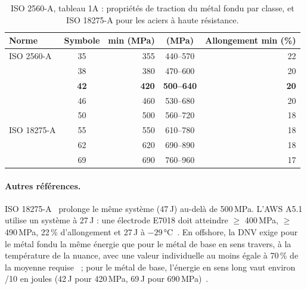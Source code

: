 \begin{table}[htbp]
\centering
\small
\caption{ISO 2560-A, tableau 1A : propriétés de traction du métal fondu par
classe, et ISO 18275-A pour les aciers à haute résistance.}
\label{tab:iso2560}
\begin{tabular}{@{}l c r c r@{}}
\toprule
Norme & Symbole & \YS{} min (MPa) & \UTS{} (MPa) & Allongement min (\%) \\
\midrule
ISO 2560-A & 35 & 355 & 440--570 & 22 \\
           & 38 & 380 & 470--600 & 20 \\
           & \textbf{42} & \textbf{420} & \textbf{500--640} & \textbf{20} \\
           & 46 & 460 & 530--680 & 20 \\
           & 50 & 500 & 560--720 & 18 \\
\midrule
ISO 18275-A & 55 & 550 & 610--780 & 18 \\
            & 62 & 620 & 690--890 & 18 \\
            & 69 & 690 & 760--960 & 17 \\
\bottomrule
\end{tabular}
\end{table}

\paragraph{Autres références.} ISO 18275-A~\cite{iso_18275} prolonge le même
système (47\,J) au-delà de 500\,MPa. L'AWS A5.1 utilise un système à 27\,J :
une électrode E7018 doit atteindre \YS{} $\geq$ 400\,MPa, \UTS{} $\geq$ 490\,MPa,
22\,\% d'allongement et 27\,J à $-29$\,°C~\cite{aws_a51}. En offshore, la
DNV exige pour le métal fondu la même énergie que pour le métal de base en sens
travers, à la température de la nuance, avec une valeur individuelle au moins
égale à 70\,\% de la moyenne requise~\cite{dnv_os_c401} ; pour le métal de
base, l'énergie en sens long vaut environ \YS/10 en joules (42\,J pour 420\,MPa,
69\,J pour 690\,MPa)~\cite{dnv_os_b101}.

